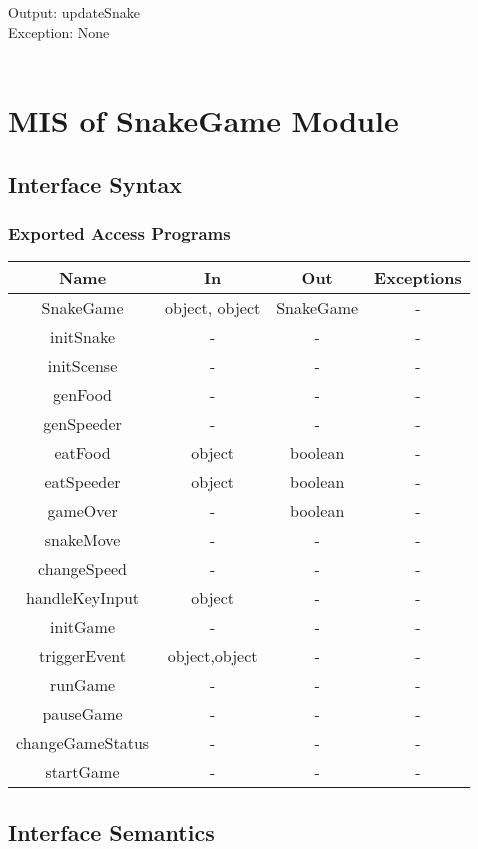 \documentclass[12pt, titlepage]{article}
\begin{document}
		Output: updateSnake\\
		
		Exception: None\\
		\\

\section{MIS of SnakeGame Module}
	\subsection{Interface Syntax}
		\subsubsection{Exported Access Programs}
	
	\begin{tabular}[pos]{|c|c|c|c|}
	\hline
	\textbf{Name}& \textbf{In} & \textbf{Out} & \textbf{Exceptions} \\ 
	\hline
	SnakeGame & object, object & SnakeGame & -\\ 
	\hline
	initSnake & - & - & -\\ 
	\hline
	initScense & - & - & - \\ 
	\hline
	genFood & - & - & -\\ 
	\hline
	genSpeeder & - & - & -\\ 
	\hline
	eatFood & object & boolean & -\\ 
	\hline
	eatSpeeder & object & boolean & -\\ 
	\hline
	gameOver & - & boolean & -\\ 
	\hline
	snakeMove & - & - & -\\ 
	\hline
	changeSpeed & - & - & -\\ 
	\hline
	handleKeyInput & object & - & -\\ 
	\hline
	initGame & - & - & -\\ 
	\hline
	triggerEvent & object,object & - & -\\ 
	\hline
	runGame & - & - & -\\ 
	\hline
	pauseGame & - & - & -\\ 
	\hline
	changeGameStatus & - & - & -\\ 
	\hline
	startGame & - & - & -\\ 
	\hline
	
					
	\end{tabular}			
		
	\subsection{Interface Semantics}
\end{document}
